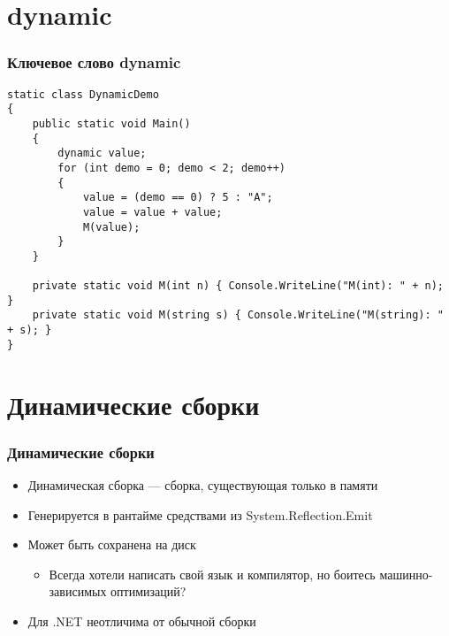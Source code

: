 \documentclass{../../slides-style}
\begin{document}
    \section{dynamic}

    \begin{frame}[fragile]
        \frametitle{Ключевое слово dynamic}
        \begin{scriptsize}
            \begin{verbatim}
static class DynamicDemo
{
    public static void Main()
    {
        dynamic value;
        for (int demo = 0; demo < 2; demo++)
        {
            value = (demo == 0) ? 5 : "A";
            value = value + value;
            M(value);
        }
    }

    private static void M(int n) { Console.WriteLine("M(int): " + n); }
    private static void M(string s) { Console.WriteLine("M(string): " + s); }
}
            \end{verbatim}
        \end{scriptsize}
    \end{frame}

    \section{Динамические сборки}

    \begin{frame}[fragile]
        \frametitle{Динамические сборки}
        \begin{itemize}
            \item Динамическая сборка --- сборка, существующая только в памяти
            \item Генерируется в рантайме средствами из System.Reflection.Emit
            \item Может быть сохранена на диск
            \begin{itemize}
                \item Всегда хотели написать свой язык и компилятор, но боитесь машинно-зависимых оптимизаций?
            \end{itemize}
            \item Для .NET неотличима от обычной сборки
        \end{itemize}
    \end{frame}
\end{document}
